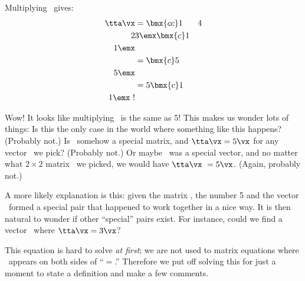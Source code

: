 Multiplying \tta\vx\ gives:
\begin{align*}
    \tta\vx &= \bmx{cc} 1&4\\2&3\emx \bmx{c}1\\1\emx\\
			&= \bmx{c}5\\5\emx\\ 
			&= 5\bmx{c}1\\1\emx \ !
\end{align*}

Wow! It looks like multiplying \tta\vx\ is the same as 5\vx! This makes us wonder lots of things: Is this the only case in the world where something like this happens? (Probably not.) Is \tta\ somehow a special matrix, and $\tta\vx = 5\vx$ for any vector \vx\ we pick? (Probably not.) Or maybe \vx\ was a special vector, and no matter what $2\times 2$ matrix \tta\ we picked, we would have $\tta\vx\ =5\vx$. (Again, probably not.)

A more likely explanation is this: given the matrix \tta, the number 5 and the vector \vx\ formed a special pair that happened to work together in a nice way. It is then natural to wonder if other ``special'' pairs exist. For instance, could we find a vector \vx\ where $\tta\vx=3\vx$?

%
%

This equation is hard to solve \textit{at first}; we are not used to matrix equations where \vx\ appears on both sides of ``$=$.'' Therefore we put off solving this for just a moment to state a definition and make a few comments.

